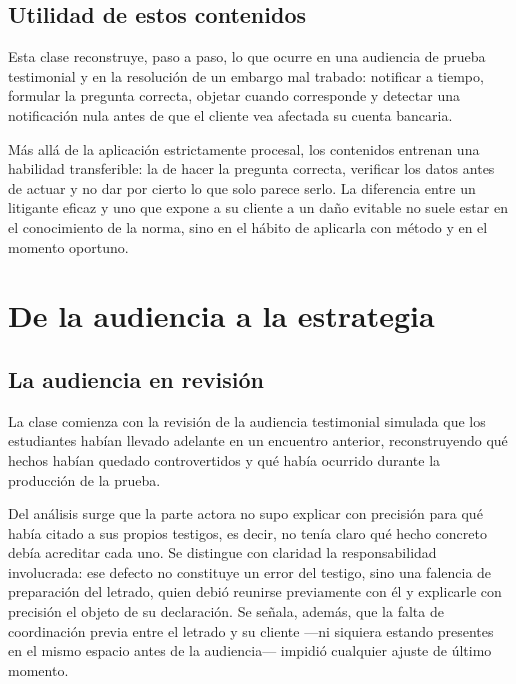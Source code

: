 \documentclass[12pt,oneside]{book}
\begin{document}
\section*{Utilidad de estos contenidos}

Esta clase reconstruye, paso a paso, lo que ocurre en una audiencia de prueba testimonial y en la resolución de un embargo mal trabado: notificar a tiempo, formular la pregunta correcta, objetar cuando corresponde y detectar una notificación nula antes de que el cliente vea afectada su cuenta bancaria.

Más allá de la aplicación estrictamente procesal, los contenidos entrenan una habilidad transferible: la de hacer la pregunta correcta, verificar los datos antes de actuar y no dar por cierto lo que solo parece serlo. La diferencia entre un litigante eficaz y uno que expone a su cliente a un daño evitable no suele estar en el conocimiento de la norma, sino en el hábito de aplicarla con método y en el momento oportuno.

\chapter{De la audiencia a la estrategia}

\section{La audiencia en revisión}

La clase comienza con la revisión de la audiencia testimonial simulada que los estudiantes habían llevado adelante en un encuentro anterior, reconstruyendo qué hechos habían quedado controvertidos y qué había ocurrido durante la producción de la prueba.

Del análisis surge que la parte actora no supo explicar con precisión para qué había citado a sus propios testigos, es decir, no tenía claro qué hecho concreto debía acreditar cada uno. Se distingue con claridad la responsabilidad involucrada: ese defecto no constituye un error del testigo, sino una falencia de preparación del letrado, quien debió reunirse previamente con él y explicarle con precisión el objeto de su declaración. Se señala, además, que la falta de coordinación previa entre el letrado y su cliente ---ni siquiera estando presentes en el mismo espacio antes de la audiencia--- impidió cualquier ajuste de último momento.
\end{document}
